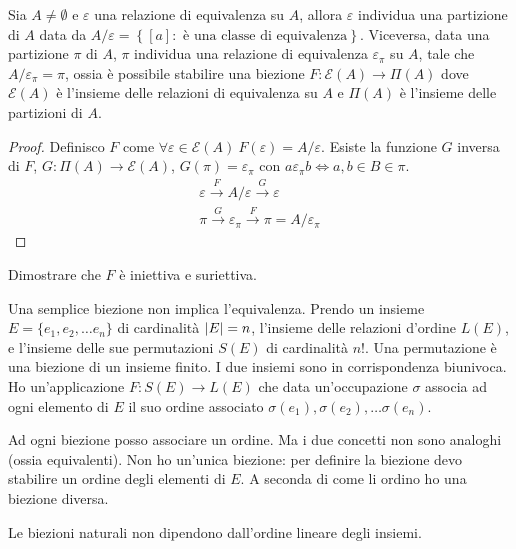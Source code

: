 \begin{prop}
Sia $A \neq \emptyset$ e $\varepsilon$ una relazione di equivalenza su $A$, allora $\varepsilon$ individua una partizione di $A$ data da $A / \varepsilon = \left \{ [a] :  \text{ \`e una classe di equivalenza}  \right \}$. Viceversa, data una partizione $\pi$ di $A$, $\pi$ individua una relazione di equivalenza $\varepsilon_{\pi}$ su $A$, tale che $A / \varepsilon_{\pi} = \pi$, ossia \`e possibile stabilire una biezione $F: \mathcal{E}(A) \to \Pi(A)$ dove $\mathcal{E}(A)$ \`e l'insieme delle relazioni di equivalenza su $A$ e $\Pi(A)$ \`e l'insieme delle partizioni di $A$.
\end{prop}
\begin{proof}
Definisco $F$ come $\forall \varepsilon \in \mathcal{E}(A) \ F(\varepsilon) = A / \varepsilon$. Esiste la funzione $G$ inversa di $F$, $G : \Pi(A) \to \mathcal{E}(A)$, $G(\pi) = \varepsilon_{\pi}$ con $a \varepsilon_{\pi} b \iff a,b \in B \in \pi$.
\begin{gather*}
\varepsilon \xrightarrow{F} A / \varepsilon \xrightarrow{G} \varepsilon \\
\pi \xrightarrow{G} \varepsilon_{\pi} \xrightarrow{F} \pi = A / \varepsilon_{\pi} 
\end{gather*}
\end{proof}

\begin{esercizio}
Dimostrare che $F$ \`e iniettiva e suriettiva.
\end{esercizio}

Una semplice biezione non implica l'equivalenza. Prendo un insieme $E = \{e_1, e_2, \dots e_n\}$ di cardinalit\`a $\left\lvert{E}\right\rvert = n$, l'insieme delle relazioni d'ordine $L(E)$, e l'insieme delle sue permutazioni $S(E)$ di cardinalit\`a $n!$. Una permutazione \`e una biezione di un insieme finito. I due insiemi sono in corrispondenza biunivoca. Ho un'applicazione $F : S(E) \to L(E)$ che data un'occupazione $\sigma$ associa ad ogni elemento di $E$ il suo ordine associato $\sigma(e_1), \sigma(e_2), \dots \sigma(e_n)$. 

Ad ogni biezione posso associare un ordine. Ma i due concetti non sono analoghi (ossia equivalenti). Non ho un'unica biezione: per definire la biezione devo stabilire un ordine degli elementi di $E$. A seconda di come li ordino ho una biezione diversa.

\begin{defn}
Le biezioni naturali non dipendono dall'ordine lineare degli insiemi.
\end{defn}

